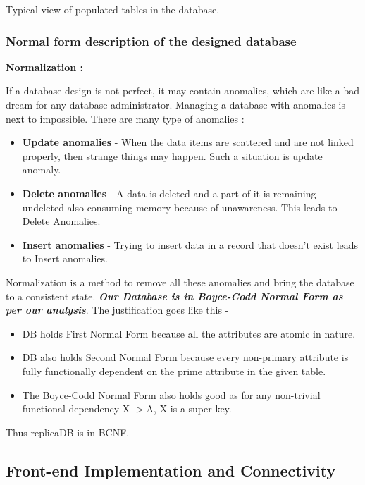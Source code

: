 \documentclass[hidelinks=true]{article}
\begin{document}
\begin{center}
\vspace{10pt} Typical view of populated tables in the database.
\end{center}

\subsubsection{Normal form description of the designed database}
\large
\textbf{Normalization : }

If a database design is not perfect, it may contain anomalies, which are like a bad dream for any database administrator. Managing a database with anomalies is next to impossible. There are many type of anomalies :
\begin{itemize}
\item \textbf{Update anomalies } - When the data items are scattered and are not linked properly, then strange things may happen. Such a situation is update anomaly.
\item \textbf{Delete anomalies } - A data is deleted and a part of it is remaining undeleted also consuming memory because of unawareness. This leads to Delete Anomalies.
\item \textbf{Insert anomalies } - Trying to insert data in a record that doesn't exist leads to Insert anomalies.
\end{itemize}

Normalization is a method to remove all these anomalies and bring the database to a consistent state. \textbf{\emph{Our Database is in Boyce-Codd Normal Form as per our analysis}}. The justification goes like this - 
\begin{itemize}
\item DB holds First Normal Form because all the attributes are atomic in nature.
\item DB also holds Second Normal Form because every non-primary attribute is fully functionally dependent on the prime attribute in the given table.
\item The Boyce-Codd Normal Form also holds good as for any non-trivial functional dependency X-$>$A, X is a super key.
\end{itemize}

Thus replicaDB is in BCNF.
\pagebreak

\subsection{Front-end Implementation and Connectivity}
\end{document}
